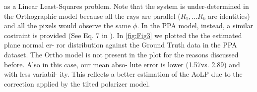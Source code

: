 \documentclass[letterpaper, 6 pt, journal, twoside]{IEEEtran}
\begin{document}
as a Linear Least-Squares problem. Note that the system is
under-determined in the Orthographic model because all the
rays are parallel ($R_1 , . . . R_k$ are identities) and all the pixels
would observe the same $\phi$. In the PPA model, instead, a
similar costraint is provided (See Eq. 7 in \cite{chen2022perspective}).
In \cref{fig:Fig3} we plotted the the estimated plane normal er-
ror distribution against the Ground Truth data in the PPA
dataset. The Ortho model is not present in the plot for the
reasons discussed before. Also in this case, our mean abso-
lute error is lower (1.57\textdegree vs. 2.89\textdegree) and with less variabil-
ity. This reflects a better estimation of the AoLP due to the
correction applied by the tilted polarizer model.

{\small


}
\end{document}
